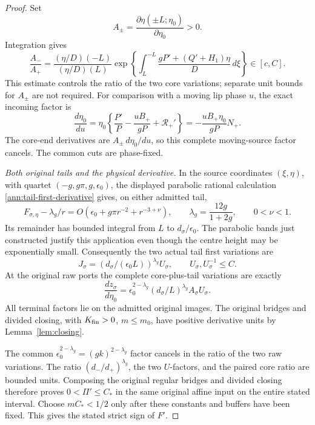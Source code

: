 \begin{proof}
Set
\[
 A_\pm=\frac{\partial\eta(\pm L;\eta_0)}{\partial\eta_0}>0.
\]
Integration gives
\begin{equation}
 \frac{A_-}{A_+}
 =\frac{(\eta/D)(-L)}{(\eta/D)(L)}
   \exp\left\{\int_L^{-L}
          \frac{gP'+(Q'+H_1)\eta}D\,d\xi\right\}
 \in[c,C].
 \label{deg:quadratic-paired-core-ratio}
\end{equation}
This estimate controls the ratio of the two core variations;
separate unit bounds for \(A_\pm\) are not required.
For comparison with a moving lip phase \(u\), the exact incoming
factor is
\[
 \frac{d\eta_0}{du}
  =\eta_0\left\{\frac{P'}P-\frac{uB_+}{gP}
                     +\mathcal R_+'\right\}
  =-\frac{uB_+\eta_0}{gP}N_+.
\]
The core-end derivatives are \(A_\pm\,d\eta_0/du\), so this
complete moving-source factor cancels. The common cuts are phase-fixed.

\smallskip
\noindent\emph{Both original tails and the physical derivative.}
In the source coordinates \((\xi,\eta)\), with quartet
\((-g,g\pi,g,\epsilon_0)\), the displayed parabolic rational
calculation \eqref{ann:tail-first-derivative} gives, on either
admitted tail,
\[
 F_{\sigma,\eta}-\lambda_g/r
   =O(\epsilon_0+g\pi r^{-2}+r^{-3+\nu}),
 \qquad \lambda_g=\frac{12g}{1+2g},\qquad 0<\nu<1.
\]
Its remainder has bounded integral from \(L\) to
\(d_\sigma/\epsilon_0\). The parabolic bands just constructed
justify this application even though the centre height may be
exponentially small. Consequently the
two actual tail first variations are
\[
 J_\sigma=(d_\sigma/(\epsilon_0L))^{\lambda_g}U_\sigma,
 \qquad U_\sigma,U_\sigma^{-1}\le C.
\]
At the original raw ports the complete core-plus-tail variations are
exactly
\begin{equation}
 \frac{dz_\sigma}{d\eta_0}
   =\epsilon_0^{2-\lambda_g}(d_\sigma/L)^{\lambda_g}
       A_\sigma U_\sigma.
 \label{deg:quadratic-paired-raw-slopes}
\end{equation}
All terminal factors lie on the admitted original images.
The original bridges and divided closing, with \(K_{\rm fin}>0\),
\(m\le m_0\), have positive derivative units by Lemma~\ref{lem:closing}.

The common \(\epsilon_0^{2-\lambda_g}=(gk)^{2-\lambda_g}\)
factor cancels in the ratio of the two raw variations. The ratio
\((d_-/d_+)^{\lambda_g}\), the two \(U\)-factors, and the
paired core ratio are bounded units. Composing the original regular
bridges and divided closing therefore proves \(0<\Pi'\le C_*\)
in the same original affine input on the entire stated interval.
Choose \(mC_*<1/2\) only after these constants and buffers have
been fixed. This gives the stated strict sign of \(F'\).
\end{proof}
